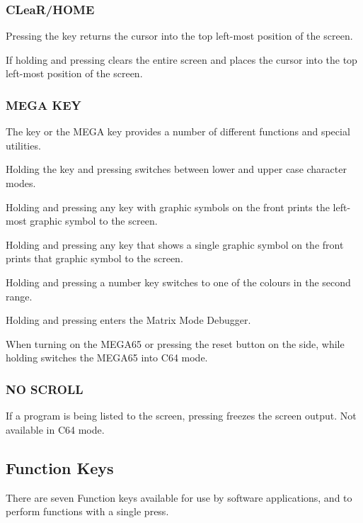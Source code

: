 \subsubsection{CLeaR/HOME}

Pressing the  key returns the cursor into the top left-most position of the screen.

If holding  and pressing  clears the entire screen and places the cursor into the top left-most position of the screen.

\subsubsection{MEGA KEY}

The \megasymbolkey key or the MEGA key provides a number of different functions and special utilities.

Holding the  key and pressing \megasymbolkey switches between lower and upper case character modes.

Holding \megasymbolkey and pressing any key with graphic symbols on the front prints the left-most graphic symbol to the screen.

Holding \megasymbolkey and pressing any key that shows a single graphic symbol on the front prints that graphic symbol to the screen.

Holding \megasymbolkey and pressing a number key switches to one of the colours in the second range.

Holding \megasymbolkey and pressing  enters the Matrix Mode Debugger.

When turning on the MEGA65 or pressing the reset button on the side, while holding \megasymbolkey switches the MEGA65 into C64 mode.

\subsubsection{NO SCROLL}
If a program is being listed to the screen, pressing  freezes the screen output. Not available in C64 mode.


\subsection{Function Keys}

There are seven Function keys available for use by software applications,       and  to perform functions with a single press.

